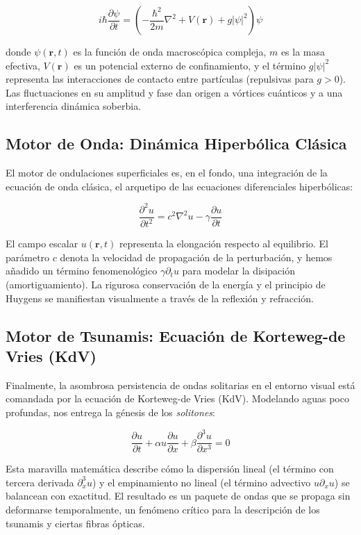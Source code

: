 \documentclass[12pt, openany]{book}
\begin{document}
\begin{equation}
i \hbar \frac{\partial \psi}{\partial t} = \left( -\frac{\hbar^2}{2m} \nabla^2 + V(\mathbf{r}) + g |\psi|^2 \right) \psi
\end{equation}

donde $\psi(\mathbf{r},t)$ es la función de onda macroscópica compleja, $m$ es la masa efectiva, $V(\mathbf{r})$ es un potencial externo de confinamiento, y el término $g |\psi|^2$ representa las interacciones de contacto entre partículas (repulsivas para $g > 0$). Las fluctuaciones en su amplitud y fase dan origen a vórtices cuánticos y a una interferencia dinámica soberbia.

\subsection{Motor de Onda: Dinámica Hiperbólica Clásica}
El motor de ondulaciones superficiales es, en el fondo, una integración de la ecuación de onda clásica, el arquetipo de las ecuaciones diferenciales hiperbólicas:

\begin{equation}
\frac{\partial^2 u}{\partial t^2} = c^2 \nabla^2 u - \gamma \frac{\partial u}{\partial t}
\end{equation}

El campo escalar $u(\mathbf{r},t)$ representa la elongación respecto al equilibrio. El parámetro $c$ denota la velocidad de propagación de la perturbación, y hemos añadido un término fenomenológico $\gamma \partial_t u$ para modelar la disipación (amortiguamiento). La rigurosa conservación de la energía y el principio de Huygens se manifiestan visualmente a través de la reflexión y refracción.

\subsection{Motor de Tsunamis: Ecuación de Korteweg-de Vries (KdV)}
Finalmente, la asombrosa persistencia de ondas solitarias en el entorno visual está comandada por la ecuación de Korteweg-de Vries (KdV). Modelando aguas poco profundas, nos entrega la génesis de los \textit{solitones}:

\begin{equation}
\frac{\partial u}{\partial t} + \alpha u \frac{\partial u}{\partial x} + \beta \frac{\partial^3 u}{\partial x^3} = 0
\end{equation}

Esta maravilla matemática describe cómo la dispersión lineal (el término con tercera derivada $\partial^3_x u$) y el empinamiento no lineal (el término advectivo $u \partial_x u$) se balancean con exactitud. El resultado es un paquete de ondas que se propaga sin deformarse temporalmente, un fenómeno crítico para la descripción de los tsunamis y ciertas fibras ópticas.
\end{document}

